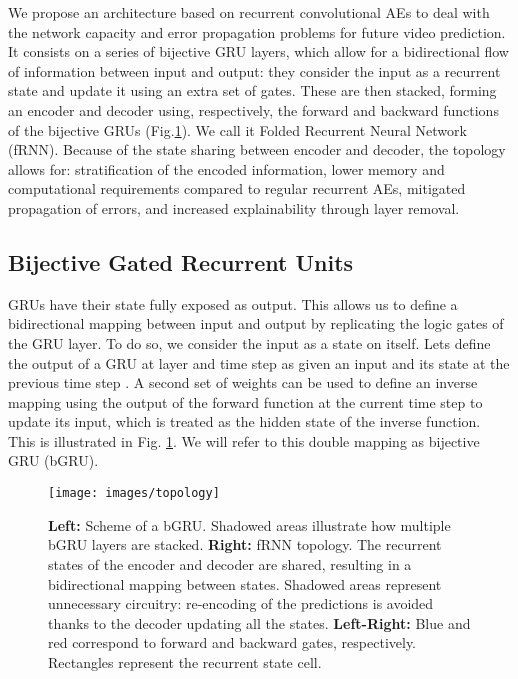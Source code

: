 \documentclass[runningheads]{llncs}
\begin{document}
We propose an architecture based on recurrent convolutional AEs to deal with the network capacity and error propagation problems for future video prediction. It consists on a series of bijective GRU layers, which allow for a bidirectional flow of information between input and output: they consider the input as a recurrent state and update it using an extra set of gates. These are then stacked, forming an encoder and decoder using, respectively, the forward and backward functions of the bijective GRUs (Fig.\ref{fig:topology}). We call it Folded Recurrent Neural Network (fRNN). Because of the state sharing between encoder and decoder, the topology allows for: stratification of the encoded information, lower memory and computational requirements compared to regular recurrent AEs, mitigated propagation of errors, and increased explainability through layer removal.

\subsection{Bijective Gated Recurrent Units}
\label{sec:method:bjgru}

GRUs have their state fully exposed as output. This allows us to define a bidirectional mapping between input and output by replicating the logic gates of the GRU layer. To do so, we consider the input as a state on itself. Lets define the output of a GRU at layer  and time step  as  given an input  and its state at the previous time step . A second set of weights can be used to define an inverse mapping  using the output of the forward function at the current time step to update its input, which is treated as the hidden state of the inverse function. This is illustrated in Fig. \ref{fig:topology}. We will refer to this double mapping as bijective GRU (bGRU).

\begin{figure}[t!]
    \centering
    \texttt{[image: images/topology]}
   \caption{\textbf{Left:} Scheme of a bGRU. Shadowed areas illustrate how multiple bGRU layers are stacked. \textbf{Right:} fRNN topology. The recurrent states of the encoder and decoder are shared, resulting in  a bidirectional mapping between states. Shadowed areas represent unnecessary circuitry: re-encoding of the predictions is avoided thanks to the decoder updating all the states. \textbf{Left-Right:} Blue and red correspond to forward and backward gates, respectively. Rectangles represent the recurrent state cell.}\vspace{-0.4cm}
    \label{fig:topology}
\end{figure}
\end{document}
